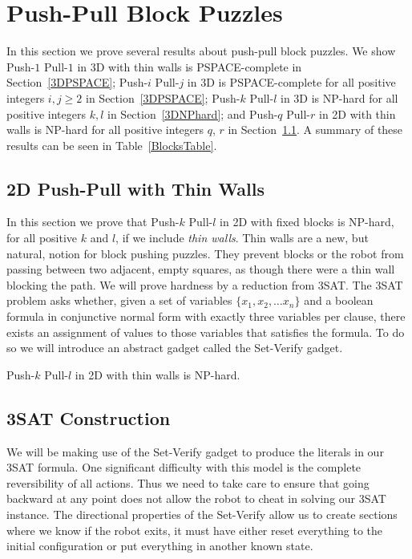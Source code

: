 
\section{Push-Pull Block Puzzles}
In this section we prove several results about push-pull block puzzles. We show Push-$1$ Pull-$1$ in 3D with thin walls is PSPACE-complete in Section~\ref{3DPSPACE}; Push-$i$ Pull-$j$ in 3D is PSPACE-complete for all positive integers $i,j \geq 2$ in Section~\ref{3DPSPACE}; Push-$k$ Pull-$l$ in 3D is NP-hard for all positive integers $k, l$ in Section~\ref{3DNPhard}; and Push-$q$ Pull-$r$ in 2D with thin walls is NP-hard for all positive integers $q$, $r$ in Section~\ref{2DNPhard}. A summary of these results can be seen in Table~\ref{BlocksTable}.


\subsection{2D Push-Pull with Thin Walls}
\label{2DNPhard}
In this section we prove that Push-$k$ Pull-$l$ in 2D with fixed blocks is NP-hard, for all positive $k$ and $l$, if we include \emph{thin walls}. Thin walls are a new, but natural, notion for block pushing puzzles. They prevent blocks or the robot from passing between two adjacent, empty squares, as though there were a thin wall blocking the path. We will prove hardness by a reduction from 3SAT. The 3SAT problem asks whether, given a set of variables $\{x_1, x_2, \ldots x_n\}$ and a boolean formula in conjunctive normal form with exactly three variables per clause, there exists an assignment of values to those variables that satisfies the formula.\cite{NPBook} To do so we will introduce an abstract gadget called the Set-Verify gadget.

\begin{theorem}
\label{thm:2DNPhard}
Push-$k$ Pull-$l$ in 2D with thin walls is NP-hard.
\end{theorem}

\subsection{3SAT Construction}
\label{sec:2DPushPull3SAT}

We will be making use of the Set-Verify gadget to produce the literals in our 3SAT formula. One significant difficulty with this model is the complete reversibility of all actions. Thus we need to take care to ensure that going backward at any point does not allow the robot to cheat in solving our 3SAT instance. The directional properties of the Set-Verify allow us to create sections where we know if the robot exits, it must have either reset everything to the initial configuration or put everything in another known state.

